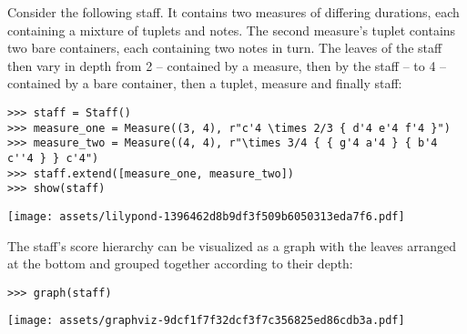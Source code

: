 \noindent Consider the following staff. It contains two measures of differing
durations, each containing a mixture of tuplets and notes. The second measure's
tuplet contains two bare containers, each containing two notes in turn. The
leaves of the staff then vary in depth from 2 -- contained by a measure, then
by the staff -- to 4 -- contained by a bare container, then a tuplet, measure
and finally staff:

\begin{comment}
<abjad>
staff = Staff()
measure_one = Measure((3, 4), r"c'4 \times 2/3 { d'4 e'4 f'4 }")
measure_two = Measure((4, 4), r"\times 3/4 { { g'4 a'4 } { b'4 c''4 } } c'4")
staff.extend([measure_one, measure_two])
show(staff)
</abjad>
\end{comment}

\begin{abjadbookoutput}
\begin{singlespacing}
\vspace{-0.5\baselineskip}
\begin{lstlisting}
>>> staff = Staff()
>>> measure_one = Measure((3, 4), r"c'4 \times 2/3 { d'4 e'4 f'4 }")
>>> measure_two = Measure((4, 4), r"\times 3/4 { { g'4 a'4 } { b'4 c''4 } } c'4")
>>> staff.extend([measure_one, measure_two])
>>> show(staff)
\end{lstlisting}
\noindent\texttt{[image: assets/lilypond-1396462d8b9df3f509b6050313eda7f6.pdf]}
\end{singlespacing}
\end{abjadbookoutput}

\noindent The staff's score hierarchy can be visualized as a graph with the
leaves arranged at the bottom and grouped together according to their depth:

\begin{comment}
<abjad>
graph(staff)
</abjad>
\end{comment}

\begin{abjadbookoutput}
\begin{singlespacing}
\vspace{-0.5\baselineskip}
\begin{lstlisting}
>>> graph(staff)
\end{lstlisting}
\noindent\texttt{[image: assets/graphviz-9dcf1f7f32dcf3f7c356825ed86cdb3a.pdf]}
\end{singlespacing}
\end{abjadbookoutput}

